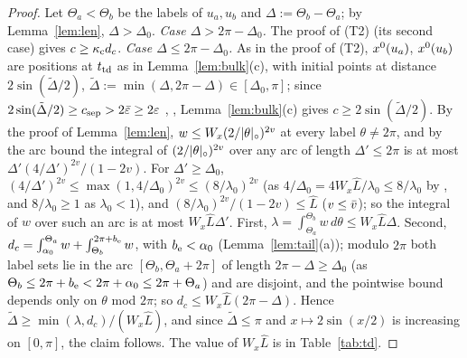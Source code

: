 \begin{proof}
Let $\Theta_a<\Theta_b$ be the labels of $u_a,u_b$ and $\Delta:=\Theta_b-\Theta_a$; by Lemma~\ref{lem:len}, $\Delta>\Delta_0$. \emph{Case
$\Delta>2\pi-\Delta_0$.} The proof of (T2) (its second case) gives $c\ge\kappa_{\mathrm c} d_c$. \emph{Case $\Delta\le2\pi-\Delta_0$.} As in the proof of (T2),
$x^0(u_a)$, $x^0(u_b)$ are positions at $t_{\mathrm{td}}$ as in Lemma~\ref{lem:bulk}(c), with initial points at distance $2\sin(\tilde\Delta/2)$,
$\tilde\Delta:=\min(\Delta,2\pi-\Delta)\in[\Delta_0,\pi]$; since $2\sin(\tilde\Delta/2)\ge c_{\mathrm{sep}}>2\bar\varepsilon\ge2\varepsilon$ ,
, Lemma~\ref{lem:bulk}(c) gives $c\ge2\sin(\tilde\Delta/2)$. By the proof of Lemma~\ref{lem:len}, $w\le W_x(2/|\theta|_\circ)^{2v}$ at
every label $\theta\ne2\pi$, and by the arc bound the integral of $(2/|\theta|_\circ)^{2v}$ over any arc of length $\Delta'\le2\pi$ is at most
$\Delta'(4/\Delta')^{2v}/(1-2v)$. For $\Delta'\ge\Delta_0$, $(4/\Delta')^{2v}\le\max(1,4/\Delta_0)^{2v}\le(8/\lambda_0)^{2v}$ (as
$4/\Delta_0=4W_x\hat L/\lambda_0\le8/\lambda_0$ by , and $8/\lambda_0\ge1$ as $\lambda_0<1$), and $(8/\lambda_0)^{2v}/(1-2v)\le\hat L$ ($v\le\bar v$); so
the integral of $w$ over such an arc is at most $W_x\hat L\Delta'$. First, $\lambda=\int_{\Theta_a}^{\Theta_b}w\,d\theta\le W_x\hat L\Delta$.
Second, $d_c=\int_{\alpha_0}^{\Theta_a}w+\int_{\Theta_b}^{2\pi+b_{\mathrm e}}w$, with $b_{\mathrm e}<\alpha_0$ (Lemma~\ref{lem:tail}(a)); modulo $2\pi$ both label sets lie
in the arc $[\Theta_b,\Theta_a+2\pi]$ of length $2\pi-\Delta\ge\Delta_0$ (as $\Theta_b\le2\pi+b_{\mathrm e}<2\pi+\alpha_0\le2\pi+\Theta_a$) and are
disjoint, and the pointwise bound depends only on $\theta$ mod $2\pi$; so $d_c\le W_x\hat L(2\pi-\Delta)$. Hence
$\tilde\Delta\ge\min(\lambda,d_c)/(W_x\hat L)$, and since $\tilde\Delta\le\pi$ and $x\mapsto2\sin(x/2)$ is increasing on $[0,\pi]$, the claim
follows. The value of $W_x\hat L$ is in Table~\ref{tab:td}.
\end{proof}

